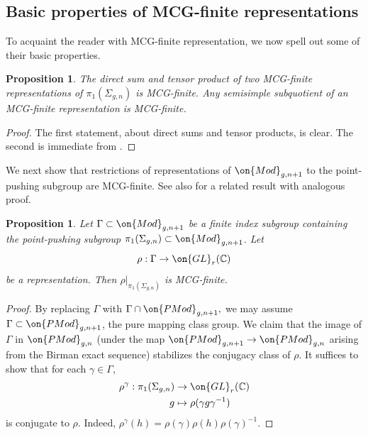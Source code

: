 \documentclass[12 pt]{amsart}
\theoremstyle{plain}
\newtheorem{proposition}[subsubsection]{Proposition}
\theoremstyle{definition}
\theoremstyle{remark}
\numberwithin{equation}{section}
\begin{document}
\subsection{Basic properties of MCG-finite representations}\label{subsection:basic-properties}

To acquaint the reader with MCG-finite representation, we now spell out some of
their basic properties.

\begin{proposition}\label{proposition:basic-properties}
	The direct sum and tensor product of two MCG-finite representations of $\pi_1(\Sigma_{g,n})$ is MCG-finite. Any semisimple subquotient of an MCG-finite representation is MCG-finite.
\end{proposition}
\begin{proof}
The first statement, about direct sums and tensor products, is clear. The second is immediate from \cite[Lemma 2.2.1]{lawrence2019representations}.
\end{proof}

We next show that restrictions of representations of $\on{Mod}_{g,n+1}$ to the
point-pushing subgroup are MCG-finite. See also \cite[Lemma
2.2]{kasahara2015visualization} for a related result with analogous proof. 

\begin{proposition}\label{proposition:MCG-finite-index-rep}
	Let $\Gamma\subset \on{Mod}_{g,n+1}$ be a finite index subgroup
	containing the point-pushing subgroup $\pi_1(\Sigma_{g,n})\subset
	\on{Mod}_{g,n+1}$. Let $$\rho:\Gamma\to \on{GL}_r(\mathbb{C})$$ be a representation. Then $\rho|_{\pi_1(\Sigma_{g,n})}$ is MCG-finite.
\end{proposition}
\begin{proof}
	By replacing $\Gamma$ with 
	$\Gamma \cap \on{PMod}_{g,n+1},$
	we may assume $\Gamma \subset \on{PMod}_{g,n+1}$,
	the pure mapping class group.  We claim that the image of $\Gamma$ in
	$\on{PMod}_{g,n}$ (under the map $\on{PMod}_{g,n+1}\to \on{PMod}_{g,n}$
	arising from the Birman exact sequence) stabilizes the conjugacy class
	of $\rho$.
	It suffices to show that for each $\gamma\in \Gamma$, 
\begin{align*}
	\rho^\gamma:  \pi_1(\Sigma_{g,n})& \rightarrow \on{GL}_r(\mathbb C) \\
	g & \mapsto \rho(\gamma g \gamma^{-1})
\end{align*}
is conjugate to $\rho$. Indeed, $\rho^\gamma(h) = \rho(\gamma) \rho(h)
\rho(\gamma)^{-1}$.
\end{proof}
\end{document}
